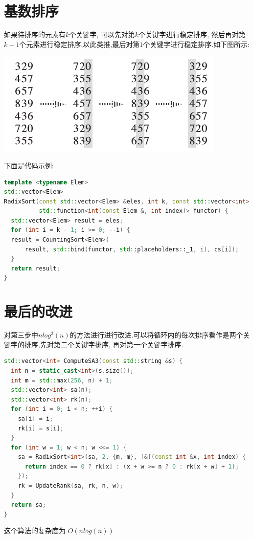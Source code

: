 \documentclass{article}
\begin{document}
\section{基数排序}
如果待排序的元素有$k$个关键字, 可以先对第$k$个关键字进行稳定排序, 然后再对第$k-1$个元素进行稳定排序,以此类推,最后对第$1$个关键字进行稳定排序.如下图所示: \par
\includegraphics[scale=0.5]{pic1.png} \par
下面是代码示例: \par
\begin{lstlisting}[language=C++, caption={Radix Sort}]
template <typename Elem>
std::vector<Elem>
RadixSort(const std::vector<Elem> &eles, int k, const std::vector<int> &cs,
          std::function<int(const Elem &, int index)> functor) {
  std::vector<Elem> result = eles;
  for (int i = k - 1; i >= 0; --i) {
  result = CountingSort<Elem>(
      result, std::bind(functor, std::placeholders::_1, i), cs[i]);
  }
  return result;
}

\end{lstlisting}

\section{最后的改进}
对第三步中$nlog^{2}(n)$的方法进行进行改进.可以将循环内的每次排序看作是两个关键字的排序,先对第二个关键字排序, 再对第一个关键字排序. \par
\begin{lstlisting}[language=C++, caption={Last Improvement}]
std::vector<int> ComputeSA3(const std::string &s) {
  int n = static_cast<int>(s.size());
  int m = std::max(256, n) + 1;
  std::vector<int> sa(n);
  std::vector<int> rk(n);
  for (int i = 0; i < n; ++i) {
    sa[i] = i;
    rk[i] = s[i];
  }
  for (int w = 1; w < n; w <<= 1) {
    sa = RadixSort<int>(sa, 2, {m, m}, [&](const int &x, int index) {
      return index == 0 ? rk[x] : (x + w >= n ? 0 : rk[x + w] + 1);
    });
    rk = UpdateRank(sa, rk, n, w);
  }
  return sa;
}
\end{lstlisting}
这个算法的复杂度为 $O(nlog(n))$
\end{document}
